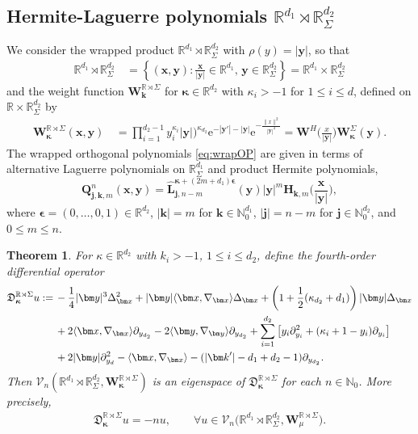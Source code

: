 \documentclass{amsart}
\newtheorem{thm}{Theorem}[section]
\theoremstyle{remark}
\def\la{{\langle}}
\def\ra{{\rangle}}
\def\e{\mathrm{e}}
\def\fD{{\mathfrak D}}
\def\k{{\kappa}}
\def\la{{\langle}}
\def\ra{{\rangle}}
\def\kb{{\bm k}}
\def\xb{{\bm x}}
\def\yb{{\bm y}}
\def\Lb{{\bm L}}
\def\Wb{{\bm W}}
\def\CV{{\mathcal V}}
\def\NN{{\mathbb N}}
\def\RR{{\mathbb R}}
\def\bep{{\boldsymbol{\epsilon}}}
\def\bk{{\boldsymbol{\kappa}}}
\begin{document}
\subsection{Hermite-Laguerre polynomials $\RR^{d_1}  \rtimes \RR_\Sigma^{d_2}$}
We consider the wrapped product  $\RR^{d_1}  \rtimes \RR_\Sigma^{d_2}$ with $\rho(y) = |\yb|$, so that 
\begin{align*}
\RR^{d_1}  \rtimes \RR_\Sigma^{d_2}\, & = \left\{(\xb,\yb): \frac{\xb}{|\yb|} \in  \RR^{d_1},  \, \yb \in \RR_\Sigma^{d_2}\right\} 
 = \RR^{d_1} \times \RR_\Sigma^{d_2}
\end{align*}
and the weight function $\Wb_{\kb}^{\RR \rtimes \Sigma}$ for $\bk \in \RR^{d_2}$ with $\k_i > -1$ for $1 \le i \le d$, 
defined on $\RR \times \RR_\Sigma^{d_2}$ by  
\begin{align} \label{eq:W-RSig}
\Wb_{\bk}^{\RR \rtimes \Sigma}(\xb,\yb) \, & =  \prod_{i=1}^{d_2-1} y_i^{\k_i} |\yb|)^{\k_{d_2}} \e^{ -|\yb'|-|\yb|}
   \e^{ - \frac{\|x\|^2}{|\yb|^2}}
   = \Wb^H \bigg( \frac{x}{|\yb|} \bigg) \Wb_{\bk}^\Sigma(\yb).
\end{align}
The wrapped orthogonal polynomials \eqref{eq:wrapOP} are given in terms of alternative Laguerre polynomials
on $\RR^{d_1}_\Sigma$ and product Hermite polynomials, 
 \begin{equation} \label{eq:OP_RSig}
 \bm Q_{\bm j, \bm k, m}^n(\bm x,\bm y) = \hat \Lb_{\bm j, n-m}^{\bk+(2m+d_1) \bep}(\bm y) |\bm y|^m   
      \bm H_{\bm k, m}  \bigg(\frac{\bm x}{|\bm y|} \bigg),
\end{equation}
where $\bep =(0,\ldots, 0, 1) \in \RR^{d_2}$, $|\bm k| = m$ for $\bm k \in \NN_0^{d_1}$, $|\bm j| = n-m$ for $\bm j \in \NN_0^{d_2}$, 
and $0 \le m  \le n$. 

\begin{thm}\label{thm:RSig}
For $\k \in \RR^{d_2}$ with $k_i > -1$, $1 \le i \le d_2$, define the fourth-order differential operator 
\begin{align} \label{eq:RSig}
  \fD_{\bk}^{\RR \rtimes \Sigma} u: = \,& -\frac14 |\yb|^3 \Delta_{\xb}^2 + |\yb| \la \xb,\nabla_\xb\ra \Delta_\xb 
   + \left(1+ \frac{1}{2} (\k_{d_2} + d_1)\right) |\yb|  \Delta_\xb  \\
     &+  2  \la \xb,\nabla_\xb\ra \partial_{y_{d_2}}
   - 2  \la \yb,\nabla_\yb\ra \partial_{y_{d_2}} + \sum_{i=1}^{d_2} \left[ y_i \partial_{y_i}^2 + (\k_i+1-y_i) \partial_{y_i} \right]
     \notag \\
    & + 2 |\yb| \partial_{y_d}^2 - \la \xb, \nabla_\xb \ra - (|\kb'|- d_1+d_2-1) \partial_{y_{d_2}}. \notag
\end{align}
Then $\CV_n(\RR^{d_1}  \rtimes \RR_\Sigma^{d_2}, \bm W_{\bk}^{\RR \rtimes \Sigma})$ is an eigenspace 
of $ \fD_{\bk}^{\RR \rtimes \Sigma}$ for each $n \in \NN_0$. More precisely, 
\begin{align} \label{eq:RSig-eigen}
  \fD_{\bk}^{\RR \rtimes \Sigma} u =  - n u, \qquad 
         \forall u \in \CV_n\big(\RR^{d_1}  \rtimes \RR_\Sigma^{d_2}, \bm W_{\mu}^{\RR \rtimes \Sigma}\big).
\end{align}
\end{thm}
\end{document}
